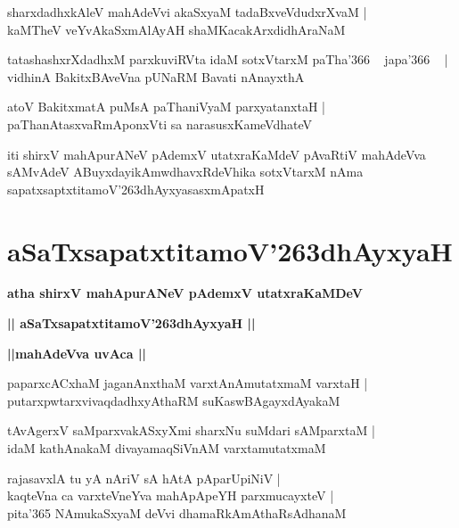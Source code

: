 \documentclass[twoside,12pt,openright]{book}
\def\S{\char'263}
\newcounter{shloka}[chapter]
\def\uvaca#1{\centerline{{\large\textbf{#1}}}}
\begin{document}
\begin{shloka}%
sharxdadhxkAleV mahAdeVvi akaSxyaM tadaBxveVdudxrXvaM |\\
kaMTheV veYvAkaSxmAlAyAH shaMKacakArxdidhAraNaM 
\end{shloka}

\begin{shloka}%
tatashashxrXdadhxM parxkuviRVta idaM sotxVtarxM paTha\char'366 ~ japa\char'366 ~ |
vidhinA BakitxBAveVna pUNaRM Bavati nAnayxthA 
\end{shloka}

\begin{shloka}%
atoV BakitxmatA puMsA paThaniVyaM parxyatanxtaH |\\
paThanAtasxvaRmAponxVti sa narasusxKameVdhateV 
\end{shloka}

\begin{center}
iti shirxV mahApurANeV pAdemxV utatxraKaMdeV pAvaRtiV mahAdeVva sAMvAdeV ABuyxdayikAmwdhavxRdeVhika 
sotxVtarxM nAma sapatxsaptxtitamoV\S dhAyxyasasxmApatxH
\end{center}

\chapter{aSaTxsapatxtitamoV\S dhAyxyaH}

\begin{center}
{\LARGE\bfseries atha shirxV mahApurANeV pAdemxV utatxraKaMDeV}
\end{center}

\begin{center}
{\LARGE\bfseries || aSaTxsapatxtitamoV\S dhAyxyaH || }
\end{center}

\uvaca{||mahAdeVva uvAca ||}

\begin{shloka}%
paparxcACxhaM jaganAnxthaM varxtAnAmutatxmaM varxtaH |\\
putarxpwtarxvivaqdadhxyAthaRM suKaswBAgayxdAyakaM 
\end{shloka}

\begin{shloka}%
tAvAgerxV saMparxvakASxyXmi sharxNu suMdari sAMparxtaM |\\
idaM kathAnakaM divayamaqSiVnAM varxtamutatxmaM
\end{shloka}

\begin{shloka}%
rajasavxlA tu yA nAriV sA hAtA pAparUpiNiV |\\
kaqteVna ca varxteVneYva mahApApeYH parxmucayxteV |\\
pita\char'365 NAmukaSxyaM deVvi dhamaRkAmAthaRsAdhanaM 
\end{shloka}
\end{document}
